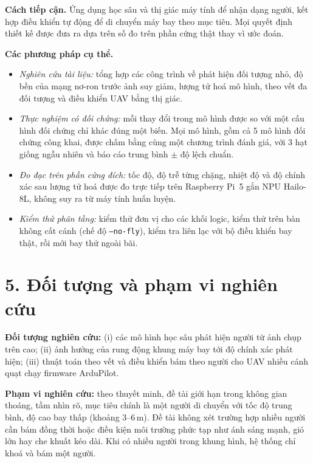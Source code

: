 \textbf{Cách tiếp cận.} Ứng dụng học sâu và thị giác máy tính để nhận dạng người, kết hợp điều khiển tự động để di chuyển máy bay theo mục tiêu. Mọi quyết định thiết kế được đưa ra dựa trên số đo trên phần cứng thật thay vì ước đoán.

\textbf{Các phương pháp cụ thể.}
\begin{itemize}
\item \textit{Nghiên cứu tài liệu:} tổng hợp các công trình về phát hiện đối tượng nhỏ, độ bền của mạng nơ-ron trước ảnh suy giảm, lượng tử hoá mô hình, theo vết đa đối tượng và điều khiển UAV bằng thị giác.
\item \textit{Thực nghiệm có đối chứng:} mỗi thay đổi trong mô hình được so với một cấu hình đối chứng chỉ khác đúng một biến. Mọi mô hình, gồm cả 5 mô hình đối chứng công khai, được chấm bằng cùng một chương trình đánh giá, với 3 hạt giống ngẫu nhiên và báo cáo trung bình $\pm$ độ lệch chuẩn.
\item \textit{Đo đạc trên phần cứng đích:} tốc độ, độ trễ từng chặng, nhiệt độ và độ chính xác sau lượng tử hoá được đo trực tiếp trên Raspberry Pi~5 gắn NPU Hailo-8L, không suy ra từ máy tính huấn luyện.
\item \textit{Kiểm thử phân tầng:} kiểm thử đơn vị cho các khối logic, kiểm thử trên bàn không cất cánh (chế độ \texttt{--no-fly}), kiểm tra liên lạc với bộ điều khiển bay thật, rồi mới bay thử ngoài bãi.
\end{itemize}

\section*{5. Đối tượng và phạm vi nghiên cứu}

\textbf{Đối tượng nghiên cứu:} (i) các mô hình học sâu phát hiện người từ ảnh chụp trên cao; (ii) ảnh hưởng của rung động khung máy bay tới độ chính xác phát hiện; (iii) thuật toán theo vết và điều khiển bám theo người cho UAV nhiều cánh quạt chạy firmware ArduPilot.

\textbf{Phạm vi nghiên cứu:} theo thuyết minh, đề tài giới hạn trong không gian thoáng, tầm nhìn rõ, mục tiêu chính là một người di chuyển với tốc độ trung bình, độ cao bay thấp (khoảng 3--6\,m). Đề tài không xét trường hợp nhiều người cần bám đồng thời hoặc điều kiện môi trường phức tạp như ánh sáng mạnh, gió lớn hay che khuất kéo dài. Khi có nhiều người trong khung hình, hệ thống chỉ khoá và bám một người.

